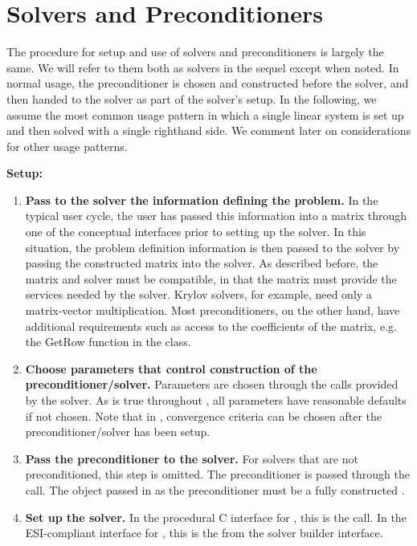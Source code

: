 \chapter{Solvers and Preconditioners}
\label{solvers}

The procedure for setup and use of solvers and preconditioners is largely
the same. We will refer to them both as solvers in the sequel except when noted. 
In normal usage, 
the preconditioner is chosen and constructed before the solver,
and then handed to the solver as part of the solver's setup.
In the following, we assume the most common usage pattern in which
a single linear system is set up and then solved with a single righthand
side. We comment later on considerations for other usage patterns.

{\bf Setup:}

\begin{enumerate}

\item
{\bf Pass to the solver the information defining the problem.} In the typical user cycle, the user
has passed this information into a matrix through one of the conceptual interfaces prior to
setting up the solver. In this situation, the problem definition information is then passed to
the solver by passing the constructed matrix into the solver. As described before, the matrix
and solver must be compatible, in that the matrix must provide the services needed by
the solver. Krylov solvers, for example, need only a matrix-vector multiplication. 
Most preconditioners, on the other hand, have additional requirements such as access to the
coefficients of the matrix, e.g. the GetRow function in the  
class.

\item
{\bf Choose parameters that control construction of the preconditioner/solver.} 
Parameters are chosen through the  calls provided by the solver.
As is true throughout \hypre{}, all parameters have reasonable defaults if not chosen.
Note that in \hypre{}, convergence criteria can be chosen after the preconditioner/solver
has been setup.

\item
{\bf Pass the preconditioner to the solver.} For solvers that are not preconditioned, this step
is omitted. The preconditioner is passed through the  call. The object passed
in as the preconditioner must be a fully constructed .

\item
{\bf Set up the solver.} In the procedural C interface for \hypre{}, this is the  call.
In the ESI-compliant interface for \hypre{}, this is the  from the
solver builder interface.

\end{enumerate}


